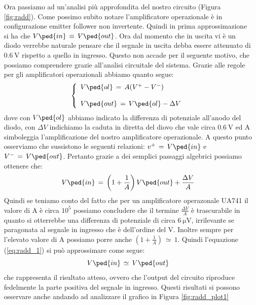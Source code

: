 Ora passiamo ad un'analisi più approfondita del nostro circuito (Figura \ref{fig:radd}). Come possimo subito notare l'amplificatore operazionale è in configurazione emitter follower non invertente. Quindi in prima approssimazione si ha che $V\ped{in}\,\equiv\,V\ped{out}$. Ora dal momento che in uscita vi è un diodo verrebbe naturale pensare che il segnale in uscita debba essere attenuato di $\SI{0.6}{\volt}$ rispetto a quello in ingresso. Questo non accade per il seguente motivo, che possiamo comprendere grazie all'analisi circuitale del sistema. Grazie alle regole per gli amplificatori operazionali abbiamo quanto segue:
\begin{equation}
        \left\{
                \begin{array}{l l l}
                        V\ped{ol}\,=\,A(V^+ - V^-)\\
                        \\
                        V\ped{out}\,=\,V\ped{ol}-\Delta V
                \end{array}
         \right.
         \label{eq:radd_1}
\end{equation}
dove con $V\ped{ol}$ abbiamo indicato la differenza di potenziale all'anodo del diodo, con $\Delta V$ indichiamo la caduta in diretta del diovo che vale circa $\SI{0.6}{\volt}$ ed A simboleggia l'amplificazione del nostro amplificatore operazionale.
A questo punto osserviamo che sussistono le seguenti relazioni: $v^+\,=\,V\ped{in}$ e $V^-\,=\,V\ped{out}$. Pertanto grazie a dei semplici passaggi algebrici possiamo ottenere che:
\begin{equation}
        V\ped{in}\,=\,\left(1+\frac{1}{A}\right)V\ped{out} + \frac{\Delta V}{A}
\end{equation}
Quindi se teniamo conto del fatto che per un amplificatore operazonale UA741 il valore di A è circa $10^5$ possiamo concludere che il termine $\frac{\Delta V}{A}$ è trascurabile in quanto si otterrebbe una differenza di potenziale di circa $\SI{6}{\micro\volt}$, irrilevante se paragonata al segnale in ingresso che è dell'ordine del $\si{\volt}$. Inoltre sempre per l'elevato valore di A possiamo porre anche $\left(1+\frac{1}{A}\right)\,\simeq\,1$. Quindi l'equazione (\ref{eq:radd_1}) si può approssimare come segue:
\begin{equation}
        V\ped{in}\,\simeq\,V\ped{out}
        \label{eq:radd_2}
\end{equation}
che rappresenta il risultato atteso, ovvero che l'output del circuito riproduce fedelmente la parte positiva del segnale in ingresso.
Questi risultati si possono osservare anche andando ad analizzare il grafico in Figura \ref{fig:radd_plot1}

